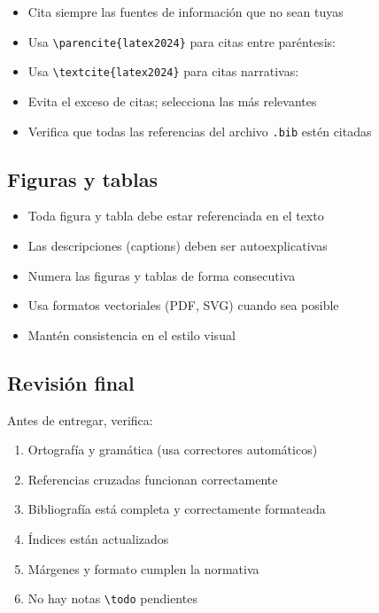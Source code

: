 \begin{itemize}
  \item Cita siempre las fuentes de información que no sean tuyas
  \item Usa \verb|\parencite{latex2024}| para citas entre paréntesis: \parencite{knuth1984texbook}
  \item Usa \verb|\textcite{latex2024}| para citas narrativas: \textcite{lamport1994latex}
  \item Evita el exceso de citas; selecciona las más relevantes
  \item Verifica que todas las referencias del archivo \texttt{.bib} estén citadas
\end{itemize}

\subsection{Figuras y tablas}

\begin{itemize}
  \item Toda figura y tabla debe estar referenciada en el texto
  \item Las descripciones (captions) deben ser autoexplicativas
  \item Numera las figuras y tablas de forma consecutiva
  \item Usa formatos vectoriales (PDF, SVG) cuando sea posible
  \item Mantén consistencia en el estilo visual
\end{itemize}

\subsection{Revisión final}

Antes de entregar, verifica:

\begin{enumerate}
  \item Ortografía y gramática (usa correctores automáticos)
  \item Referencias cruzadas funcionan correctamente
  \item Bibliografía está completa y correctamente formateada
  \item Índices están actualizados
  \item Márgenes y formato cumplen la normativa
  \item No hay notas \texttt{\textbackslash todo} pendientes
\end{enumerate}
